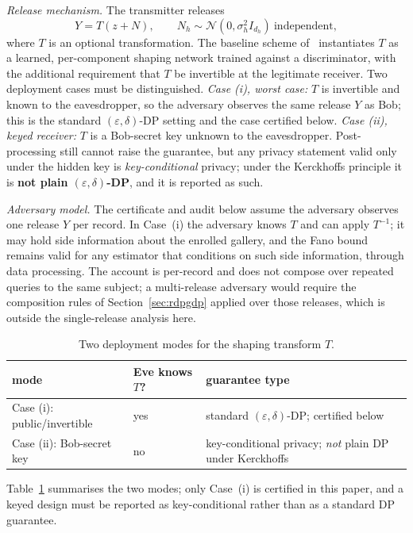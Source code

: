 \documentclass[10pt,twocolumn,letterpaper]{article}
\theoremstyle{plain}
\theoremstyle{definition}
\begin{document}
\emph{Release mechanism.} The transmitter releases
\begin{equation}
Y=T\!\left(z+N\right),\qquad
N_h\sim\mathcal{N}\!\left(0,\sigma_h^{2} I_{d_h}\right)\ \text{independent},
\label{eq:mechanism}
\end{equation}
where $T$ is an optional transformation. The baseline scheme
of~\cite{arXiv2510} instantiates $T$ as a learned, per-component shaping
network trained against a discriminator, with the additional requirement that
$T$ be invertible at the legitimate receiver. Two deployment cases must be
distinguished. \emph{Case (i), worst case:} $T$ is invertible and known to the
eavesdropper, so the adversary observes the same release $Y$ as Bob; this is the
standard $(\varepsilon,\delta)$-DP setting and the case certified below.
\emph{Case (ii), keyed receiver:} $T$ is a Bob-secret key unknown to the
eavesdropper. Post-processing still cannot raise the guarantee, but any
privacy statement valid only under the hidden key is \emph{key-conditional}
privacy; under the Kerckhoffs principle it is \textbf{not plain
$(\varepsilon,\delta)$-DP}, and it is reported as such.

\emph{Adversary model.} The certificate and audit below assume the adversary
observes one release $Y$ per record. In Case~(i) the adversary knows $T$ and
can apply $T^{-1}$; it may hold side information about the enrolled gallery,
and the Fano bound remains valid for any estimator that conditions on such
side information, through data processing. The account is per-record and does
not compose over repeated queries to the same subject; a multi-release adversary
would require the composition rules of Section~\ref{sec:rdpgdp} applied over
those releases, which is outside the single-release analysis here.

\begin{table}[h]
\centering\footnotesize
\setlength{\tabcolsep}{3pt}
\caption{Two deployment modes for the shaping transform $T$.}
\label{tab:modes}
\begin{tabular}{p{2.2cm}p{2.1cm}p{2.4cm}}
\toprule
mode & Eve knows $T$? & guarantee type \\
\midrule
Case (i): public/invertible & yes & standard $(\varepsilon,\delta)$-DP;
certified below \\
Case (ii): Bob-secret key & no & key-conditional privacy; \emph{not} plain DP
under Kerckhoffs \\
\bottomrule
\end{tabular}
\end{table}
Table~\ref{tab:modes} summarises the two modes; only Case~(i) is certified in
this paper, and a keyed design must be reported as key-conditional rather than
as a standard DP guarantee.
\end{document}
